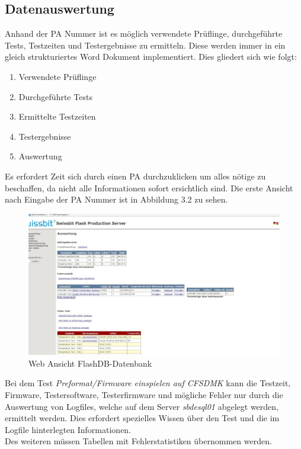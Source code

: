 \subsection{Datenauswertung}
Anhand der \ac{PA} Nummer ist es möglich verwendete Prüflinge, durchgeführte Tests, Testzeiten und Testergebnisse zu ermitteln. Diese werden immer in ein gleich strukturiertes Word Dokument implementiert. Dies gliedert sich wie folgt:
\begin{enumerate}
\item Verwendete Prüflinge
\item Durchgeführte Tests
\item Ermittelte Testzeiten
\item Testergebnisse
\item Auswertung
\end{enumerate}
Es erfordert Zeit sich durch einen \ac{PA} durchzuklicken um alles nötige zu beschaffen, da nicht alle Informationen sofort ersichtlich sind. Die erste Ansicht nach Eingabe der \ac{PA} Nummer ist in Abbildung 3.2 zu sehen.
\begin{figure}
\centering
\includegraphics[scale=0.5]{images/flashdb_web01}
\caption{Web Ansicht FlashDB-Datenbank}
\label{fig:Auswertung}
\end{figure}
Bei dem Test \textit{Preformat/Firmware einspielen auf \ac{CFSDMK}} kann die Testzeit, Firmware, Testersoftware, Testerfirmware und mögliche Fehler nur durch die Auswertung von Logfiles, welche auf dem Server \textit{sbdesql01} abgelegt werden, ermittelt werden. Dies erfordert spezielles Wissen über den Test und die im Logfile hinterlegten Informationen. \\ Des weiteren müssen Tabellen mit Fehlerstatistiken übernommen werden. 

	\vspace{5mm}
	

